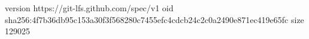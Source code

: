 version https://git-lfs.github.com/spec/v1
oid sha256:4f7b36db95c153a30f3f568280c7455efc4cdcb24c2c0a2490e871ec419e65fc
size 129025
